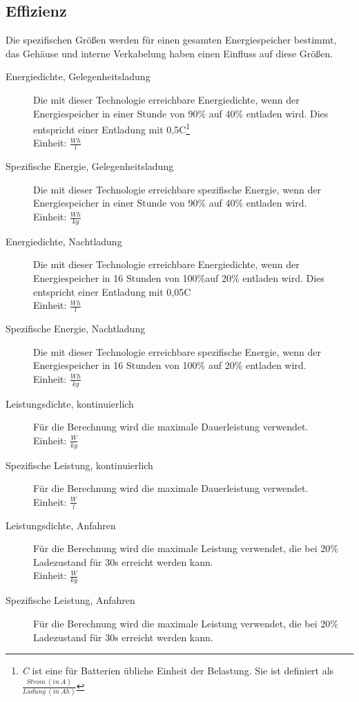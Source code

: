 \documentclass{scrartcl}
\begin{document}
\subsection{Effizienz}
Die spezifischen Größen werden für einen gesamten Energiespeicher bestimmt, das Gehäuse und interne Verkabelung haben einen Einfluss auf diese Größen.
\begin{description}
	\item[Energiedichte, Gelegenheitsladung] Die mit dieser Technologie erreichbare Energiedichte, wenn der Energiespeicher in einer Stunde von 90\% auf 40\% entladen wird. Dies entspricht einer Entladung mit 0,5C\footnote{\emph{C} ist eine für Batterien übliche Einheit der Belastung. Sie ist definiert als $\frac{Strom\ (in\ A)}{Ladung\ (in\ Ah)}$}\\
	Einheit: $\frac{Wh}{l}$ 
	\item[Spezifische Energie, Gelegenheitsladung] Die mit dieser Technologie erreichbare spezifische Energie, wenn der Energiespeicher in einer Stunde von 90\% auf 40\% entladen wird.\\
	Einheit: $\frac{Wh}{kg}$
	\item[Energiedichte, Nachtladung] Die mit dieser Technologie erreichbare Energiedichte, wenn der Energiespeicher in 16 Stunden von 100\%auf 20\% entladen wird. Dies entspricht einer Entladung mit 0,05C\\
	Einheit: $\frac{Wh}{l}$
	\item[Spezifische Energie, Nachtladung] Die mit dieser Technologie erreichbare spezifische Energie, wenn der Energiespeicher in 16 Stunden von 100\% auf 20\% entladen wird.\\
	Einheit: $\frac{Wh}{kg}$
	\item[Leistungsdichte, kontinuierlich] Für die Berechnung wird die maximale Dauerleistung verwendet.\\
	Einheit: $\frac{W}{kg}$
	\item[Spezifische Leistung, kontinuierlich] Für die Berechnung wird die maximale Dauerleistung verwendet.\\
	Einheit: $\frac{W}{l}$
	\item[Leistungsdichte, Anfahren] Für die Berechnung wird die maximale Leistung verwendet, die bei 20\% Ladezustand für 30s erreicht werden kann.\\
	Einheit: $\frac{W}{kg}$
	\item[Spezifische Leistung, Anfahren] Für die Berechnung wird die maximale Leistung verwendet, die bei 20\% Ladezustand für 30s erreicht werden kann.\\

\end{description}
\end{document}
